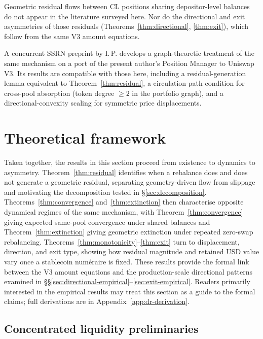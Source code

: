 \documentclass[11pt,a4paper]{article}
\theoremstyle{plain}
\begin{document}
Geometric residual flows between CL positions sharing depositor-level balances do not appear in the literature surveyed here. Nor do the directional and exit asymmetries of those residuals (Theorems~\ref{thm:directional}, \ref{thm:exit}), which follow from the same V3 amount equations.

A concurrent SSRN preprint by I.\,P.\cite{secondoperator2026} develops a graph-theoretic treatment of the same mechanism on a port of the present author's Position Manager to Uniswap V3. Its results are compatible with those here, including a residual-generation lemma equivalent to Theorem~\ref{thm:residual}, a circulation-path condition for cross-pool absorption (token degree $\geq 2$ in the portfolio graph), and a directional-convexity scaling for symmetric price displacements.

\section{Theoretical framework}\label{sec:theory}

Taken together, the results in this section proceed from existence to dynamics to asymmetry. Theorem~\ref{thm:residual} identifies when a rebalance does and does not generate a geometric residual, separating geometry-driven flow from slippage and motivating the decomposition tested in \S\ref{sec:decomposition}. Theorems~\ref{thm:convergence} and~\ref{thm:extinction} then characterise opposite dynamical regimes of the same mechanism, with Theorem~\ref{thm:convergence} giving expected same-pool convergence under shared balances and Theorem~\ref{thm:extinction} giving geometric extinction under repeated zero-swap rebalancing. Theorems~\ref{thm:monotonicity}--\ref{thm:exit} turn to displacement, direction, and exit type, showing how residual magnitude and retained USD value vary once a stablecoin num\'eraire is fixed. These results provide the formal link between the V3 amount equations and the production-scale directional patterns examined in \S\S\ref{sec:directional-empirical}--\ref{sec:exit-empirical}. Readers primarily interested in the empirical results may treat this section as a guide to the formal claims; full derivations are in Appendix~\ref{app:dr-derivation}.

\subsection{Concentrated liquidity preliminaries}\label{sec:preliminaries}
\end{document}
